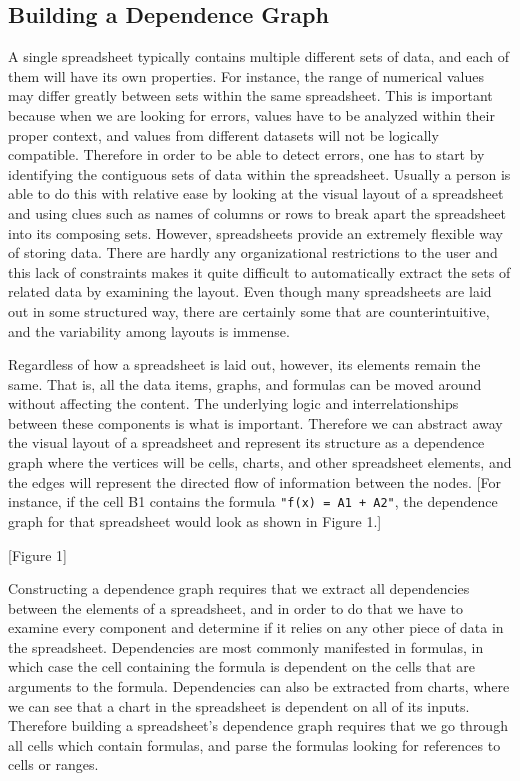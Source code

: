 \subsection{Building a Dependence Graph}

A single spreadsheet typically contains multiple different sets of
data, and each of them will have its own properties.  For instance,
the range of numerical values may differ greatly between sets within
the same spreadsheet.  This is important because when we are looking
for errors, values have to be analyzed within their proper context,
and values from different datasets will not be logically compatible.
Therefore in order to be able to detect errors, one has to start by
identifying the contiguous sets of data within the spreadsheet.
Usually a person is able to do this with relative ease by looking at
the visual layout of a spreadsheet and using clues such as names of
columns or rows to break apart the spreadsheet into its composing
sets.  However, spreadsheets provide an extremely flexible way of
storing data.  There are hardly any organizational restrictions to the
user and this lack of constraints makes it quite difficult to
automatically extract the sets of related data by examining the
layout.  Even though many spreadsheets are laid out in some structured
way, there are certainly some that are counterintuitive, and the
variability among layouts is immense.

Regardless of how a spreadsheet is laid out, however, its elements
remain the same.  That is, all the data items, graphs, and formulas
can be moved around without affecting the content.  The underlying
logic and interrelationships between these components is what is
important.  Therefore we can abstract away the visual layout of a
spreadsheet and represent its structure as a dependence graph where
the vertices will be cells, charts, and other spreadsheet elements,
and the edges will represent the directed flow of information between
the nodes.  [For instance, if the cell B1 contains the formula
 \verb|"f(x) = A1 + A2"|, the dependence graph for that spreadsheet would
  look as shown in Figure 1.]

[Figure 1]

Constructing a dependence graph requires that we extract all
dependencies between the elements of a spreadsheet, and in order to do
that we have to examine every component and determine if it relies
on any other piece of data in the spreadsheet.  Dependencies are most
commonly manifested in formulas, in which case the cell containing the
formula is dependent on the cells that are arguments to the formula.
Dependencies can also be extracted from charts, where we can see that
a chart in the spreadsheet is dependent on all of its inputs.  Therefore
building a spreadsheet's dependence graph requires that we go through
all cells which contain formulas, and parse the formulas looking for
references to cells or ranges.

